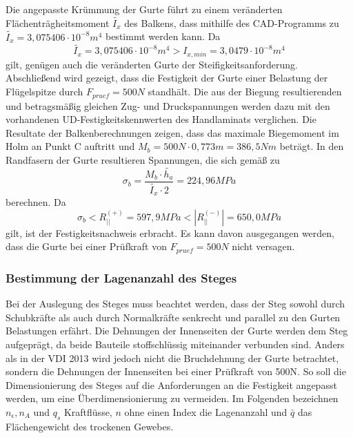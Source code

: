 \noindent Die angepasste Krümmung der Gurte führt zu einem veränderten Flächenträgheitsmoment $ \tilde{I_{x}} $ des Balkens, dass mithilfe des CAD-Programms zu $ \tilde{I_{x}}=3,075406\cdot 10^{-8}m^{4} $ bestimmt werden kann. Da 
\begin{equation}
	\label{IVergleich}
	\tilde{I_{x}}=3,075406\cdot 10^{-8}m^{4} > I_{x,min}=3,0479\cdot 10^{-8}m^{4}
\end{equation}
gilt, genügen auch die veränderten Gurte der Steifigkeitsanforderung.\\
 
\noindent Abschließend wird gezeigt, dass die Festigkeit der Gurte einer Belastung der Flügelspitze durch $ F_{pruef}=500N $ standhält. Die aus der Biegung resultierenden und betragsmäßig gleichen Zug- und Druckspannungen werden dazu mit den vorhandenen UD-Festigkeitskennwerten des Handlaminats verglichen. Die Resultate der Balkenberechnungen zeigen, dass das maximale Biegemoment im Holm an Punkt C auftritt und $ M_{b}=500N\cdot 0,773m=386,5Nm $ beträgt. In den Randfasern der Gurte resultieren Spannungen, die sich gemäß \cite{item15} zu\\
\begin{equation}
	\sigma_{b}=\frac{M_{b}\cdot \tilde{h_{a}}}{\tilde{I_{x}}\cdot 2}=224,96MPa
\end{equation} 
berechnen. Da 
\begin{equation}
	\sigma_{b}< R^{(+)}_{||}=597,9 MPa < |R^{(-)}_{||}| =650,0 MPa
\end{equation} 
gilt, ist der Festigkeitsnachweis erbracht. Es kann davon ausgegangen werden, dass die Gurte bei einer Prüfkraft von $ F_{pruef}=500N $ nicht versagen. \\

\subsubsection{Bestimmung der Lagenanzahl des Steges}
Bei der Auslegung des Steges muss beachtet werden, dass der Steg sowohl durch Schubkräfte als auch durch Normalkräfte senkrecht und parallel zu den Gurten Belastungen erfährt. Die Dehnungen der Innenseiten der Gurte werden dem Steg aufgeprägt, da beide Bauteile stoffschlüssig miteinander verbunden sind. Anders als in der VDI 2013 wird jedoch nicht die Bruchdehnung der Gurte betrachtet, sondern die Dehnungen der Innenseiten bei einer Prüfkraft von 500N. So soll die Dimensionierung des Steges auf die Anforderungen an die Festigkeit angepasst werden, um eine Überdimensionierung zu vermeiden. Im Folgenden bezeichnen $ n_{\epsilon}, n_{A} $ und $ q_{s} $ Kraftflüsse, $ n $ ohne einen Index die Lagenanzahl und $ \bar{q} $ das Flächengewicht des trockenen Gewebes.\\

